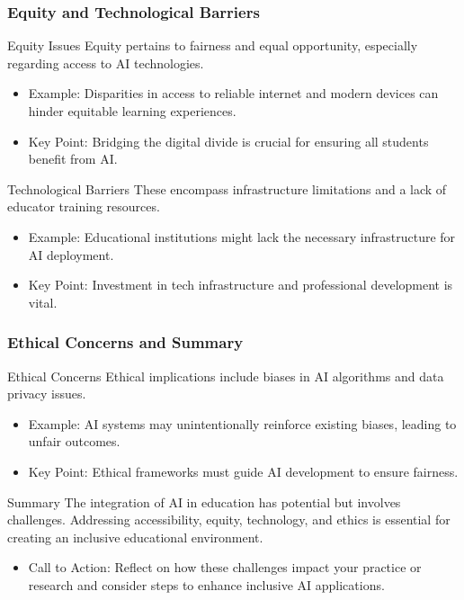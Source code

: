 \documentclass[aspectratio=169]{beamer}
\begin{document}
\begin{frame}[fragile]
  \frametitle{Equity and Technological Barriers}
  
  \begin{block}{Equity Issues}
  Equity pertains to fairness and equal opportunity, especially regarding access to AI technologies.
  \end{block}

  \begin{itemize}
    \item Example: Disparities in access to reliable internet and modern devices can hinder equitable learning experiences.
    \item Key Point: Bridging the digital divide is crucial for ensuring all students benefit from AI.
  \end{itemize}
  
  \begin{block}{Technological Barriers}
  These encompass infrastructure limitations and a lack of educator training resources.
  \end{block}

  \begin{itemize}
    \item Example: Educational institutions might lack the necessary infrastructure for AI deployment.
    \item Key Point: Investment in tech infrastructure and professional development is vital.
  \end{itemize}
  
\end{frame}

\begin{frame}[fragile]
  \frametitle{Ethical Concerns and Summary}
  
  \begin{block}{Ethical Concerns}
  Ethical implications include biases in AI algorithms and data privacy issues.
  \end{block}

  \begin{itemize}
    \item Example: AI systems may unintentionally reinforce existing biases, leading to unfair outcomes.
    \item Key Point: Ethical frameworks must guide AI development to ensure fairness.
  \end{itemize}

  \begin{block}{Summary}
  The integration of AI in education has potential but involves challenges. Addressing accessibility, equity, technology, and ethics is essential for creating an inclusive educational environment.
  \end{block}

  \begin{itemize}
    \item Call to Action: Reflect on how these challenges impact your practice or research and consider steps to enhance inclusive AI applications.
  \end{itemize}
  
\end{frame}
\end{document}
